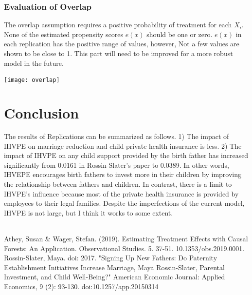 \documentclass[11pt,a4paper]{article}
\let\origfigure\figure
\let\endorigfigure\endfigure
\renewenvironment{figure}[1][2] {
    \expandafter\origfigure\expandafter[H]
} {
    \endorigfigure
}
\begin{document}
\hypertarget{Evaluation of Overlap}{%
\subsubsection{Evaluation of Overlap}\label{Evaluation of Overlap}}

The overlap assumption requires a positive probability of treatment for each $X_i$. None of the estimated propensity scores $e(x)$ should be one or zero. $e(x)$ in each replication has the positive range of values, however, Not a few values are shown to be close to 1. This part will need to be improved for a more robust model in the future.

\begin{figure}
\centering
\texttt{[image: overlap]}
\hfill
\caption{Histogram of e(x)}
\label{overlap}
\end{figure}

\hypertarget{conclusion}{%
\section{\texorpdfstring{Conclusion
\label{chap:conc}}{Conclusion }}\label{conclusion}}
The results of Replications can be summarized as follows. 
1) The impact of IHVPE on marriage reduction and child private health insurance is less. 2) The impact of IHVPE on any child support provided by the birth father has increased significantly from 0.0161 in Rossin-Slater's paper to 0.0389. In other words, IHVEPE encourages birth fathers to invest more in their children by improving the relationship between fathers and children. In contrast, there is a limit to IHVPE's influence because most of the private health insurance is provided by employees to their legal families. Despite the imperfections of the current model, IHVPE is not large, but I think it works to some extent.


\pagebreak

\textbf{\textit{}} \\

Athey, Susan & Wager, Stefan. (2019). Estimating Treatment Effects with Causal Forests: An Application. Observational Studies. 5. 37-51. 10.1353/obs.2019.0001. \\

Rossin-Slater, Maya. doi: 2017. "Signing Up New Fathers: Do Paternity Establishment Initiatives Increase Marriage, Maya Rossin-Slater, Parental Investment, and Child Well-Being?" American Economic Journal: Applied Economics, 9 (2): 93-130. doi:10.1257/app.20150314\\
\end{document}
